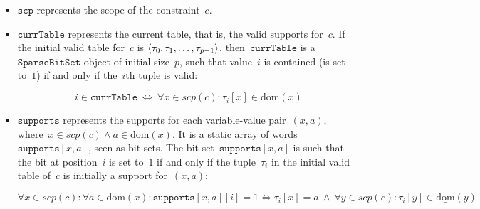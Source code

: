 \documentclass[a4paper,11pt]{article}
\newcommand{\Dom}[1]{\text{dom}({#1})}
\newcommand{\Dominit}[1]{\underline{\text{dom}}(#1)}
\newcommand{\SparseBitSet}{\texttt{SparseBitSet}}
\newcommand{\Scp}{\texttt{scp}}
\newcommand{\CurrTable}{\texttt{currTable}}
\newcommand{\Supports}{\texttt{supports}}
\numberwithin{equation}{section}
\begin{document}
\begin{itemize}
  \item $\Scp$ represents the scope of the constraint~$c$.
  
  \item $\CurrTable$ represents the current table,
    that is, the valid supports for~$c$. If the initial valid table for~$c$
    is
    $\left\langle\tau_0, \tau_1, \ldots, \tau_{p-1}\right\rangle$,
    then~$\CurrTable$ is a 
    $\SparseBitSet$ object of initial size~$p$, such that value~$i$
    is contained (is set to~$1$) if and only if the~$i$th tuple is valid:
    
    \begin{equation} \label{eq:currtable}
      i \in \CurrTable \ \Leftrightarrow \ \forall x \in scp(c): \tau_i[x] \in \Dom{x}
    \end{equation}

  \item $\Supports$ represents the supports for each variable-value pair~$(x,a)$,
    where~$x \in scp(c) \land a \in \Dom{x}$.
    It is a static array of words~$\Supports[x,a]$, seen as bit-sets.
    The bit-set~$\Supports[x,a]$ is such that
    the bit at position~$i$ is set to~$1$ if and only if the 
    tuple~$\tau_i$ in the initial valid table of~$c$ is initially a support for~$(x,a)$:

    \begin{equation}
      \forall x \in scp(c): \forall a \in \Dom{x}:
      \Supports[x,a][i] = 1 \Leftrightarrow \tau_i[x] = a \ \land \
      \forall y \in scp(c): \tau_i[y] \in \Dominit{y}
    \end{equation}


    

\end{itemize}
\end{document}
